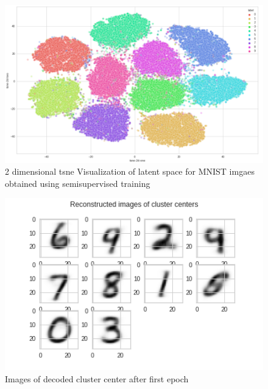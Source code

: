 \documentclass{uai2021} %
\begin{document}
\begin{figure}[]
\centering
\includegraphics[width=\linewidth]{tsne_semi.png}
\caption{2 dimensional tsne Visualization of latent space for MNIST imgaes obtained using semisupervised training }
\label{tsne_semi}
\end{figure}

\begin{figure}[]
\centering
\includegraphics[width=\linewidth]{cluster_centers_epoch_1.0_gmm}
\caption{Images of decoded cluster center after first epoch}
\label{cluster_center_1_gmm}
\end{figure}
\end{document}
